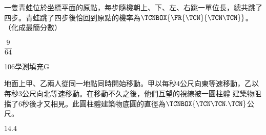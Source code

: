 \begin{QUESTIONS}
\begin{QUESTION}
        \begin{ExamAnsRateInfo}{19}{45}{11}{1}
        \end{ExamAnsRateInfo}
        \begin{QBODY}
            一隻青蛙位於坐標平面的原點，每步隨機朝上、下、左、右跳一單位長，總共跳了四步。青蛙跳了四步後恰回到原點的機率為$\TCNBOX{\FR{\TCN}{\TCN\TCN}}$。（化成最簡分數）
        \end{QBODY}
        \begin{QFROMS}
        \end{QFROMS}
        \begin{QTAGS}\end{QTAGS}
        \begin{QANS}
            $\dfrac{9}{64}$
        \end{QANS}
        \begin{QSOLLIST}
        \end{QSOLLIST}
        \begin{QEMPTYSPACE}
        \end{QEMPTYSPACE}
    \end{QUESTION}
    \begin{QUESTION}
        \begin{ExamInfo}{106}{學測}{填充}{G}
        \end{ExamInfo}
        \begin{ExamAnsRateInfo}{22}{56}{9}{1}
        \end{ExamAnsRateInfo}
        \begin{QBODY}
            地面上甲、乙兩人從同一地點同時開始移動。甲以每秒4公尺向東等速移動，乙以每秒3公尺向北等速移動。在移動不久之後，他們互望的視線被一圓柱體 建築物阻擋了6秒後才又相見。此圓柱體建築物底圓的直徑為$\TCNBOX{\TCN\TCN.\TCN}$公尺。
        \end{QBODY}
        \begin{QFROMS}
        \end{QFROMS}
        \begin{QTAGS}\end{QTAGS}
        \begin{QANS}
            $14.4$
        \end{QANS}
        \begin{QSOLLIST}
        \end{QSOLLIST}
        \begin{QEMPTYSPACE}
        \end{QEMPTYSPACE}
    \end{QUESTION}
\end{QUESTIONS}

